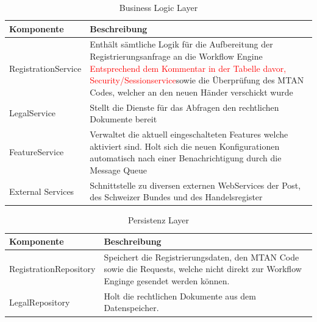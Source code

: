 \begin{table}[H]
	\centering
	\caption{Business Logic Layer}
	\begin{tabular}{ | p{4cm} | p{11cm} | }
		\toprule
		{\textbf{Komponente}} & {\textbf{Beschreibung}} \\
		\midrule
		RegistrationService &  Enthält sämtliche Logik für die Aufbereitung der Registrierungsanfrage an die Workflow Engine \textcolor{red}{Entsprechend dem Kommentar in der Tabelle davor, Security/Sessionservice}sowie die Überprüfung des MTAN Codes, welcher an den neuen Händer verschickt wurde\\ \hline
		LegalService &  Stellt die Dienste für das Abfragen den rechtlichen Dokumente bereit \\ \hline
		FeatureService &  Verwaltet die aktuell eingeschalteten Features welche aktiviert sind. Holt sich die neuen Konfigurationen automatisch nach einer Benachrichtigung durch die Message Queue \\ \hline
		External Services & Schnittstelle zu diversen externen WebServices der Post, des Schweizer Bundes und des Handelsregister \\
		\bottomrule
	\end{tabular}
\end{table}

\begin{table}[H]
	\centering
	\caption{Persistenz Layer}
	\begin{tabular}{ | p{4cm} | p{11cm} | }
		\toprule
		{\textbf{Komponente}} & {\textbf{Beschreibung}} \\
		\midrule
		RegistrationRepository &  Speichert die Registrierungsdaten, den MTAN Code sowie die Requests, welche nicht direkt zur Workflow Enginge gesendet werden können. \\ \hline
		LegalRepository &  Holt die rechtlichen Dokumente aus dem Datenspeicher. \\
		\bottomrule
	\end{tabular}
\end{table}

